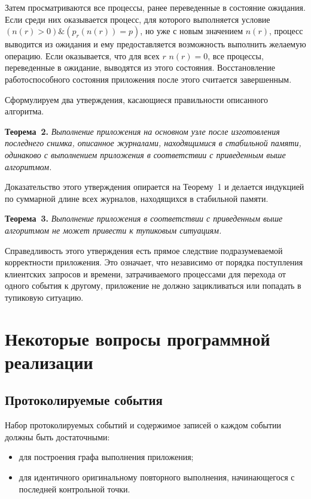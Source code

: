 \begin{multicols}{2}
Затем просматриваются все процессы, ранее переведенные в состояние
ожидания. Если среди них оказывается процесс, для которого выполняется
условие $(n(r)>0) \& (p_r(n(r)) = p)$, но уже с новым значением $n(r)$,  процесс
выводится из ожидания и ему предоставляется возможность выполнить
желаемую операцию. Если оказывается, что для всех $r$ $n(r)=0$, все
процессы, переведенные в ожидание, выводятся из этого состояния.
Восстановление работоспособного состояния приложения после этого
считается завершенным.

Сформулируем два утверждения, касающиеся правильности описанного
алгоритма.

\textbf{Теорема~2.} \textit{Выполнение приложения на основном узле после
изготовления последнего снимка, описанное журналами, находящимися в стабильной 
памяти, одинаково с выполнением приложения в соответствии с приведенным выше 
алгоритмом.}

Доказательство этого утверждения опирается на Теорему~1 и делается индукцией по 
суммарной длине всех журналов, находящихся в стабильной па\-мяти.

\textbf{Теорема~3.} \textit{Выполнение приложения в соответствии с приведенным 
выше алгоритмом не может привести к тупиковым ситуациям.}

Справедливость этого утверждения есть прямое следствие подразумеваемой
корректности приложения. Это  означает, что независимо от порядка
поступления клиентских запросов и времени, затрачиваемого процессами для
перехода от одного события к другому, приложение не должно зацикливаться
или попадать в тупиковую ситуацию.

\section{Некоторые вопросы программной реализации}

\subsection*{Протоколируемые события}

Набор протоколируемых событий и содержимое записей о каждом событии
должны быть  достаточными:
\begin{itemize}
\item для построения графа выполнения приложения;
\item для идентичного оригинальному повторного выполнения, начинающегося с
последней контрольной точки.
\end{itemize}


\end{multicols}
